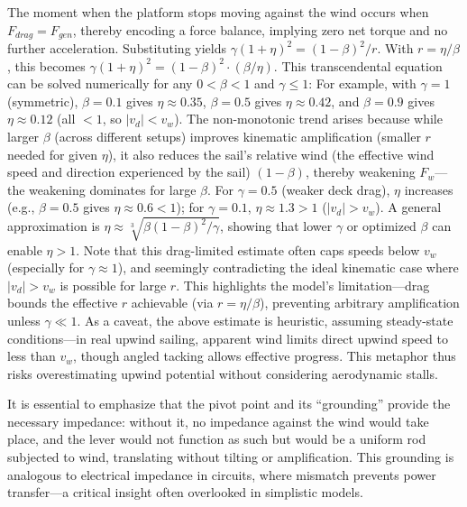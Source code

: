 \documentclass[reprint,aps,pra,superscriptaddress,longbibliography]{revtex4-2}
\begin{document}
The moment when the platform stops moving against the wind occurs when $F_{drag} = F_{gen}$, thereby encoding a force balance, implying zero net torque and no further acceleration. Substituting yields $\gamma (1 + \eta)^2 = (1 - \beta)^2 / r$. With $r = \eta / \beta$, this becomes $\gamma (1 + \eta)^2 = (1 - \beta)^2 \cdot (\beta / \eta)$.
This transcendental equation can be solved numerically for any $0 < \beta < 1$ and $\gamma \leq 1$:
For example, with $\gamma=1$ (symmetric), $\beta=0.1$ gives $\eta \approx 0.35$, $\beta=0.5$
gives $\eta \approx 0.42$, and $\beta=0.9$ gives $\eta \approx 0.12$ (all $<1$, so $|v_d| < v_w$).
The non-monotonic trend arises because while larger $\beta$ (across different setups) improves kinematic amplification
(smaller $r$ needed for given $\eta$), it also reduces the sail's relative wind
(the effective wind speed and direction experienced by the sail) $(1 - \beta)$,
thereby weakening $F_w$---the weakening dominates for large $\beta$. For $\gamma=0.5$ (weaker deck drag),
$\eta$ increases (e.g., $\beta=0.5$ gives $\eta \approx 0.6 <1$); for $\gamma=0.1$, $\eta \approx 1.3 >1$ ($|v_d| > v_w$).
A general approximation is $\eta \approx \sqrt[3]{\beta (1 - \beta)^2 / \gamma}$,
showing that lower $\gamma$ or optimized $\beta$ can enable $\eta >1$.
Note that this drag-limited estimate often caps speeds below $v_w$ (especially for $\gamma \approx 1$),
and seemingly contradicting the ideal kinematic case where $|v_d| > v_w$ is possible for large $r$.
This highlights the model's limitation---drag bounds the effective $r$ achievable (via $r = \eta / \beta$),
preventing arbitrary amplification unless $\gamma \ll 1$.
As a caveat, the above estimate is heuristic, assuming steady-state conditions---in real upwind sailing,
apparent wind limits direct upwind speed to less than $v_w$, though angled tacking allows effective progress.
This metaphor thus risks overestimating upwind potential without considering aerodynamic stalls.

It is essential to emphasize that the pivot point and its ``grounding'' provide the necessary impedance: without it, no impedance against the wind would take place, and the lever would not function as such but would be a uniform rod subjected to wind, translating without tilting or amplification. This grounding is analogous to electrical impedance in circuits, where mismatch prevents power transfer---a critical insight often overlooked in simplistic models.
\end{document}
